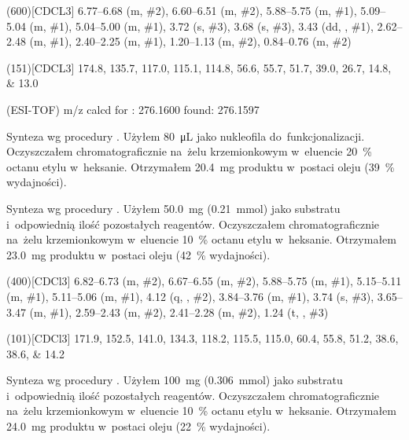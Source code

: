 \begin{fullexp}
  \NMR(600)[CDCL3] \numrange{6.77}{6.68} (m, \#{2}), \numrange{6.60}{6.51} (m, \#{2}), \numrange{5.88}{5.75} (m, \#{1}), \numrange{5.09}{5.04} (m, \#{1}), \numrange{5.04}{5.00} (m, \#{1}), \num{3.72} (s, \#{3}), \num{3.68} (s, \#{3}), \num{3.43} (dd, , \#{1}), \numrange{2.62}{2.48} (m, \#{1}), \numrange{2.40}{2.25} (m, \#{1}), \numrange{1.20}{1.13} (m, \#{2}), \numrange{0.84}{0.76} (m, \#{2})\par\noindent
  (151)[CDCL3] \numlist{174.8; 135.7; 117.0; 115.1; 114.8; 56.6; 55.7; 51.7; 39.0; 26.7; 14.8; 13.0}\par\noindent
   (ESI-TOF) m/z calcd for : \num{276.1600} found: \num{276.1597}
\end{fullexp}

Synteza wg procedury .
Użyłem \SI{80}{\uL}  jako nukleofila do~funkcjonalizacji.
Oczyszczałem chromatograficznie na~żelu krzemionkowym w~eluencie \SI{20}{\percent} octanu
  etylu w~heksanie.
Otrzymałem \SI{20.4}{\mg} produktu w~postaci oleju (\SI{39}{\percent} wydajności).

Synteza wg procedury .
Użyłem \SI{50.0}{\mg} (\SI{0.21}{\milli\mole})  jako substratu
  i~odpowiednią ilość pozostałych reagentów.
Oczyszczałem chromatograficznie na~żelu krzemionkowym w~eluencie \SI{10}{\percent} octanu
  etylu w~heksanie.
Otrzymałem \SI{23.0}{\mg} produktu w~postaci oleju (\SI{42}{\percent} wydajności).

\begin{fullexp}
  \NMR(400)[CDCl3] \numrange{6.82}{6.73} (m, \#{2}), \numrange{6.67}{6.55} (m, \#{2}), \numrange{5.88}{5.75} (m, \#{1}), \numrange{5.15}{5.11} (m, \#{1}), \numrange{5.11}{5.06} (m, \#{1}), \num{4.12} (q, , \#{2}), \numrange{3.84}{3.76} (m, \#{1}), \num{3.74} (s, \#{3}), \numrange{3.65}{3.47} (m, \#{1}), \numrange{2.59}{2.43} (m, \#{2}), \numrange{2.41}{2.28} (m, \#{2}), \num{1.24} (t, , \#{3})\par\noindent
  (101)[CDCl3] \numlist{171.9; 152.5; 141.0; 134.3; 118.2; 115.5; 115.0; 60.4; 55.8; 51.2; 38.6; 38.6; 14.2}
\end{fullexp}


Synteza wg procedury .
Użyłem \SI{100}{\mg} (\SI{0.306}{\milli\mole})  jako substratu
  i~odpowiednią ilość pozostałych reagentów.
Oczyszczałem chromatograficznie na~żelu krzemionkowym w~eluencie \SI{10}{\percent} octanu
  etylu w~heksanie.
Otrzymałem \SI{24.0}{\mg} produktu w~postaci oleju (\SI{22}{\percent} wydajności).
